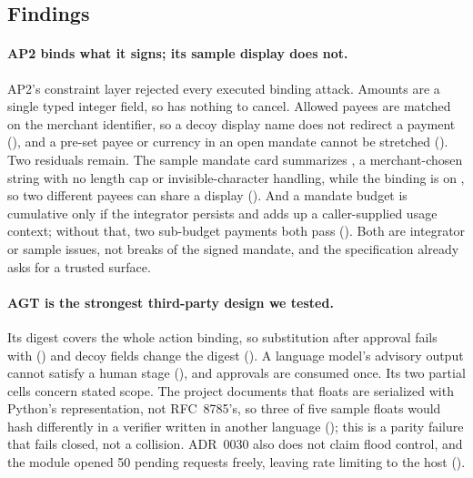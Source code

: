 \subsection{Findings}

\paragraph{AP2 binds what it signs; its sample display does not.} AP2's constraint layer rejected every executed
binding attack. Amounts are a single typed integer field, so  has nothing to cancel. Allowed payees are
matched on the merchant identifier, so a decoy display name does not redirect a payment (), and a pre-set
payee or currency in an open mandate cannot be stretched (). Two residuals remain. The sample mandate card
summarizes , a merchant-chosen string with no length cap or invisible-character handling, while
the binding is on , so two different payees can share a display (). And a mandate budget is
cumulative only if the integrator persists and adds up a caller-supplied usage context; without that, two
sub-budget payments both pass (). Both are integrator or sample issues, not breaks of the signed
mandate, and the specification already asks for a trusted surface.

\paragraph{AGT is the strongest third-party design we tested.} Its digest covers the whole action binding, so
substitution after approval fails with  () and decoy fields change the
digest (). A language model's advisory output cannot satisfy a human stage (), and approvals are
consumed once. Its two partial cells concern stated scope. The project documents that floats are serialized with Python's
representation, not RFC~8785's, so three of five sample floats would hash differently in a verifier written in
another language (); this is a parity failure that fails closed, not a collision. ADR~0030 also does not
claim flood control, and the module opened 50 pending requests freely, leaving rate limiting to the host
().


